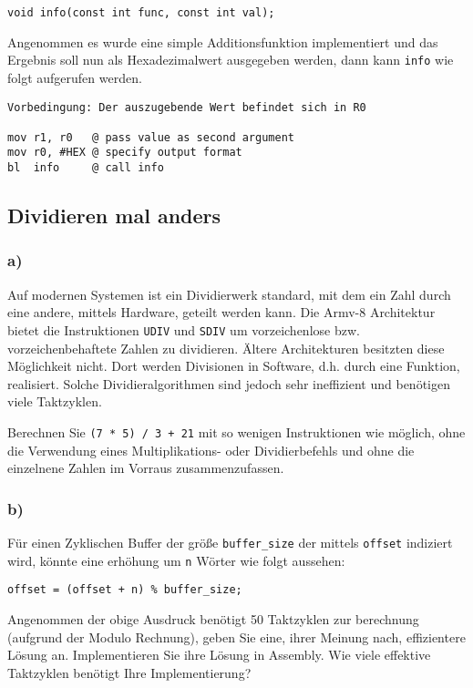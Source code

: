 \documentclass[12pt]{article}
\begin{document}
\begin{lstlisting}
void info(const int func, const int val);
\end{lstlisting}

Angenommen es wurde eine simple Additionsfunktion implementiert und das Ergebnis
soll nun als Hexadezimalwert ausgegeben werden, dann kann \texttt{info} wie
folgt aufgerufen werden.

\begin{lstlisting}
Vorbedingung: Der auszugebende Wert befindet sich in R0

mov r1, r0   @ pass value as second argument
mov r0, #HEX @ specify output format
bl  info     @ call info
\end{lstlisting}


\subsection{Dividieren mal anders}
\subsubsection{a)}
Auf modernen Systemen ist ein Dividierwerk standard, mit dem ein Zahl durch eine
andere, mittels Hardware, geteilt werden kann. Die Armv-8 Architektur bietet
die Instruktionen \texttt{UDIV} und \texttt{SDIV} um vorzeichenlose bzw.
vorzeichenbehaftete Zahlen zu dividieren. Ältere Architekturen besitzten diese
Möglichkeit nicht. Dort werden Divisionen in Software, d.h. durch eine Funktion, realisiert. 
Solche Dividieralgorithmen sind jedoch sehr ineffizient und benötigen viele
Taktzyklen.

Berechnen Sie \texttt{(7 * 5) / 3 + 21} mit so wenigen Instruktionen wie
möglich, ohne die Verwendung eines Multiplikations- oder Dividierbefehls und
ohne die einzelnene Zahlen im Vorraus zusammenzufassen.

\subsubsection{b)}
Für einen Zyklischen Buffer der größe \texttt{buffer\_size} der mittels
\texttt{offset} indiziert wird, könnte eine erhöhung um \texttt{n} Wörter wie
folgt aussehen:

\begin{lstlisting}
offset = (offset + n) % buffer_size;
\end{lstlisting}

Angenommen der obige Ausdruck benötigt 50 Taktzyklen zur berechnung (aufgrund
der Modulo Rechnung), geben Sie
eine, ihrer Meinung nach, effizientere Lösung an. Implementieren Sie ihre Lösung
in Assembly. Wie viele effektive Taktzyklen benötigt Ihre Implementierung?
\end{document}
